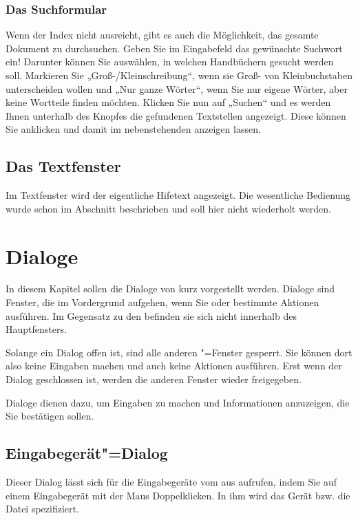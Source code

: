 \subsection{Das Suchformular}

Wenn der Index nicht ausreicht, gibt es auch die Möglichkeit, das
gesamte Dokument zu durchsuchen. Geben Sie im Eingabefeld das
gewünschte Suchwort ein! Darunter können Sie auswählen, in welchen
Handbüchern gesucht werden soll. Markieren Sie
„Groß-/Kleinschreibung“, wenn sie Groß- von Kleinbuchstaben
unterscheiden wollen und „Nur ganze Wörter“, wenn Sie nur eigene
Wörter, aber keine Wortteile finden möchten. Klicken Sie nun auf
„Suchen“ und es werden Ihnen unterhalb des Knopfes die gefundenen
Textstellen angezeigt. Diese können Sie anklicken und damit im
nebenstehenden  anzeigen
lassen.

\section{Das Textfenster}
\label{sec:das-textfenster}


Im Textfenster wird der eigentliche Hifetext angezeigt. Die wesentliche Bedienung wurde schon im Abschnitt  beschrieben und soll hier nicht wiederholt werden.


\chapter{Dialoge}\label{sec:DE_DIALOGS}

In diesem Kapitel sollen die Dialoge von \mutabor{} kurz vorgestellt
werden.  Dialoge sind Fenster, die im Vordergrund aufgehen, wenn Sie
oder \mutabor{} bestimmte Aktionen ausführen. Im Gegensatz zu den
 befinden sie sich nicht
innerhalb des Hauptfensters.

Solange ein Dialog offen ist, sind alle anderen \mutabor"=Fenster
gesperrt. Sie können dort also keine Eingaben machen und auch keine
Aktionen ausführen. Erst wenn der Dialog geschlossen ist, werden die
anderen Fenster wieder freigegeben.

Dialoge dienen dazu, um Eingaben zu machen und Informationen
anzuzeigen, die Sie bestätigen sollen.  

\section{Eingabegerät"=Dialog}
\label{sec:DE_R0}
Dieser Dialog lässt sich für die Eingabegeräte vom  
aus aufrufen, indem Sie auf einem Eingabegerät mit der Maus 
Doppelklicken. In ihm wird das Gerät bzw. die Datei spezifiziert.

